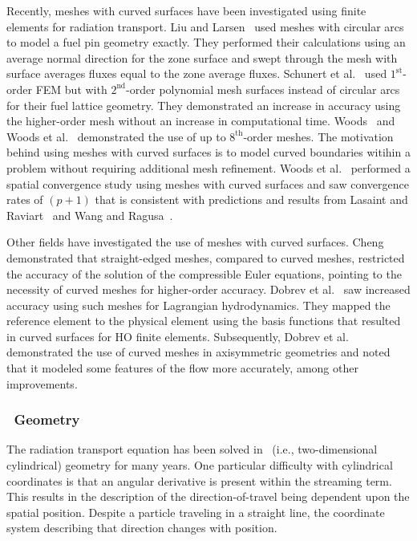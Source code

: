 \documentclass[12pt,letterpaper]{article}
\begin{document}
Recently, meshes with curved surfaces have been investigated using finite elements for radiation transport. Liu and Larsen~\cite{Liu2015SNCurvedMesh} used meshes with circular arcs to model a fuel pin geometry exactly. They performed their calculations using an average normal direction for the zone surface and swept through the mesh with surface averages fluxes equal to the zone average fluxes. Schunert et al.~\cite{Schunert2017HOMeshes} used $1^\text{st}$-order FEM but with $2^\text{nd}$-order polynomial mesh surfaces instead of circular arcs for their fuel lattice geometry. They demonstrated an increase in accuracy using the higher-order mesh without an increase in computational time. Woods~\cite{WoodsThesis} and Woods et al.~\cite{WoodsHoDgfemXyCurved} demonstrated the use of up to $8^\text{th}$-order meshes. The motivation behind using meshes with curved surfaces is to model curved boundaries witihin a problem without requiring additional mesh refinement. Woods et al.~\cite{WoodsHoDgfemXyCurved} performed a spatial convergence study using meshes with curved surfaces and saw convergence rates of $(p+1)$ that is consistent with predictions and results from Lasaint and Raviart~\cite{LasaintFEM} and Wang and Ragusa~\cite{WangHODGTransport}.


Other fields have investigated the use of meshes with curved surfaces. Cheng~\cite{ChengCurvMeshEulerEqs} demonstrated that straight-edged meshes, compared to curved meshes, restricted the accuracy of the solution of the compressible Euler equations, pointing to the necessity of curved meshes for higher-order accuracy. Dobrev et al.~\cite{DobrevHOFEMHydro} saw increased accuracy using such meshes for Lagrangian hydrodynamics. They mapped the reference element to the physical element using the basis functions that resulted in curved surfaces for HO finite elements. Subsequently, Dobrev et al.~\cite{DobrevHOAxisymmetric} demonstrated the use of curved meshes in axisymmetric geometries and noted that it modeled some features of the flow more accurately, among other improvements.

\subsubsection{\RZ\ Geometry}
\label{sec:RZGeometryIntro}
The radiation transport equation has been solved in \RZ\ (i.e., two-dimensional cylindrical) geometry for many years. One particular difficulty with cylindrical coordinates is that an angular derivative is present within the streaming term. This results in the description of the direction-of-travel being dependent upon the spatial position. Despite a particle traveling in a straight line, the coordinate system describing that direction changes with position. 
\end{document}
